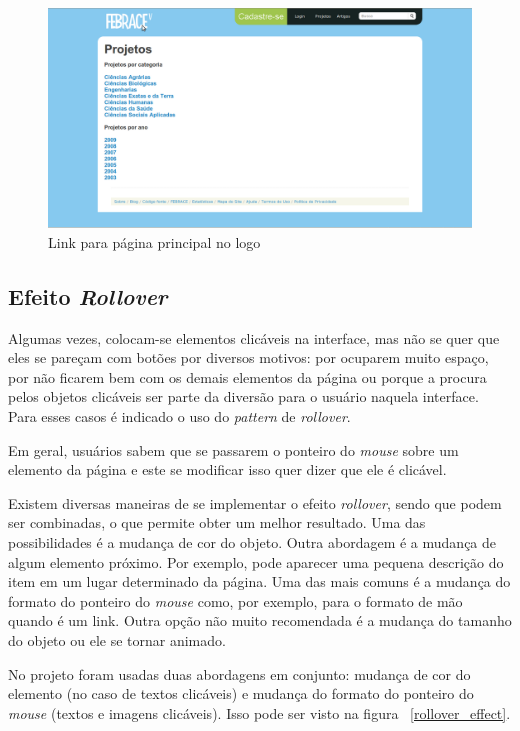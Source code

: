     \begin{figure}[h]
        \begin{center}
    \includegraphics[width=0.7\linewidth]{arquivos/home_link.png}
        \end{center}
        \caption{Link para página principal no logo}
        \label{home_link}
    \end{figure}

\subsection{Efeito \textit{Rollover}}

Algumas vezes, colocam-se elementos clicáveis na interface, mas não se quer que eles se pareçam com botões por diversos motivos: por ocuparem muito espaço, por não ficarem bem com os demais elementos da página ou porque a procura pelos objetos clicáveis ser parte da diversão para o usuário naquela interface. Para esses casos é indicado o uso do \textit{pattern} de \textit{rollover}.

Em geral, usuários sabem que se passarem o ponteiro do \textit{mouse} sobre um elemento da página e este se modificar isso quer dizer que ele é clicável.

Existem diversas maneiras de se implementar o efeito \textit{rollover}, sendo que podem ser combinadas, o que permite obter um melhor resultado. Uma das possibilidades é a mudança de cor do objeto. Outra abordagem é a mudança de algum elemento próximo. Por exemplo, pode aparecer uma pequena descrição do item em um lugar determinado da página. Uma das mais comuns é a mudança do formato do ponteiro do \textit{mouse} como, por exemplo, para o formato de mão quando é um link. Outra opção não muito recomendada é a mudança do tamanho do objeto ou ele se tornar animado.

No projeto foram usadas duas abordagens em conjunto: mudança de cor do elemento (no caso de textos clicáveis) e mudança do formato do ponteiro do \textit{mouse} (textos e imagens clicáveis). Isso pode ser visto na figura ~\ref{rollover_effect}.

